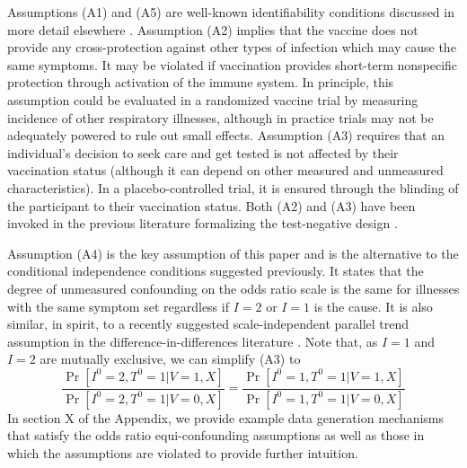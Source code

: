 \documentclass[11pt]{article}
\begin{document}
Assumptions (A1) and (A5) are well-known identifiability conditions discussed in more detail elsewhere \cite{hernan_causal_2020}. Assumption (A2) implies that the vaccine does not provide any cross-protection against other types of infection which may cause the same symptoms.   It may be violated if vaccination provides short-term nonspecific protection through activation of the immune system. In principle, this assumption could be evaluated in a randomized vaccine trial by measuring incidence of other respiratory illnesses, although in practice trials may not be adequately powered to rule out small effects. Assumption (A3) requires that an individual's decision to seek care and get tested is not affected by their vaccination status (although it can depend on other measured and unmeasured characteristics). In a placebo-controlled trial, it is ensured through the blinding of the participant to their vaccination status. Both (A2) and (A3) have been invoked in the previous literature formalizing the test-negative design \cite{jackson_test-negative_2013,schnitzer_estimands_2022}.

Assumption (A4) is the key assumption of this paper and is the alternative to the conditional independence conditions suggested previously. It states that the degree of unmeasured confounding on the odds ratio scale is the same for illnesses with the same symptom set regardless if $I=2$ or $I=1$ is the cause. It is also similar, in spirit, to a recently suggested  scale-independent parallel trend assumption in the difference-in-differences literature \cite{park_universal_2023,tchetgen_universal_2023}. Note that, as $I = 1$ and $I = 2$ are mutually exclusive, we can simplify (A3) to
\begin{equation}
    \frac{\Pr[I^0 = 2, T^0 = 1 | V = 1, X]}{\Pr[I^0 = 2, T^0 = 1 | V = 0, X]} =\frac{\Pr[I^0 = 1, T^0 = 1 | V = 1, X]}{\Pr[I^0 = 1, T^0 = 1 | V = 0, X]}
\end{equation}
In section X of the Appendix, we provide example data generation mechanisms that satisfy the odds ratio equi-confounding assumptions as well as those in which the assumptions are violated to provide further intuition.
\end{document}
